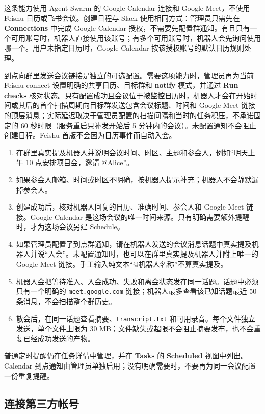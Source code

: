 \documentclass[UTF8,a4paper,11pt]{ctexart}
\begin{document}
这条能力使用 Agent Swarm 的 Google Calendar 连接和 Google Meet，不使用 Feishu 日历或飞书会议。创建日程与 Slack 使用相同方式：管理员只需先在 \textbf{Connections} 中完成 Google Calendar 授权，不需要先配置群通知。有且只有一个可用账号时，机器人直接使用该账号；有多个可用账号时，机器人会先询问使用哪一个。用户未指定日历时，Google Calendar 按该授权账号的默认日历规则处理。

到点向群里发送会议链接是独立的可选配置。需要这项能力时，管理员再为当前 Feishu connect 设置明确的共享日历、目标群和 \textbf{notify} 模式，并通过 \textbf{Run checks} 核对状态。只有配置成功且会议位于被监控日历时，机器人才会在开始时间或其后的首个扫描周期向目标群发送包含会议标题、时间和 Google Meet 链接的顶层消息；实际延迟取决于管理员配置的扫描间隔和当时的任务积压，不承诺固定的 60 秒时限（服务重启只补发开始后 5 分钟内的会议）。未配置通知不会阻止创建日程。Feishu 首版不会因为日历事件而自动入会。

\begin{enumerate}
  \item 在群里真实提及机器人并说明会议时间、时区、主题和参会人，例如“明天上午 10 点安排项目会，邀请 @Alice”。
  \item 如果参会人邮箱、时间或时区不明确，按机器人提示补充；机器人不会静默漏掉参会人。
  \item 创建成功后，核对机器人回复的日历、准确时间、参会人和 Google Meet 链接。Google Calendar 是这场会议的唯一时间来源。只有明确需要额外提醒时，才为这场会议另建 Schedule。
  \item 如果管理员配置了到点群通知，请在机器人发送的会议消息话题中真实提及机器人并说“入会”。未配置通知时，也可以在群里真实提及机器人并附上唯一的 Google Meet 链接。手工输入纯文本“@机器人名称”不算真实提及。
  \item 机器人会把等待准入、入会成功、失败和离会状态发在同一话题。话题中必须只有一个明确的 \texttt{meet.google.com} 链接；机器人最多查看该已知话题最近 50 条消息，不会扫描整个群历史。
  \item 散会后，在同一话题查看摘要、\texttt{transcript.txt} 和可用录音。每个文件独立发送，单个文件上限为 30 MB；文件缺失或超限不会阻止摘要发布，也不会重复已经成功发送的产物。
\end{enumerate}

普通定时提醒仍在任务详情中管理，并在 \textbf{Tasks} 的 \textbf{Scheduled} 视图中列出。Calendar 到点通知由管理员单独启用；没有明确需要时，不要再为同一会议配置一份重复提醒。

\subsection{连接第三方帐号}
\end{document}
